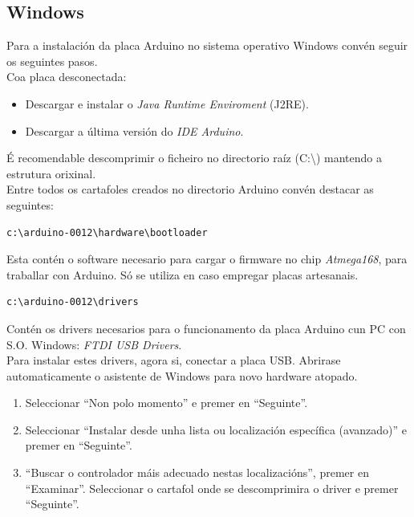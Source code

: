  \subsection{Windows}

 Para a instalación da placa Arduino no sistema operativo Windows convén seguir
 os seguintes pasos. \\

 Coa placa desconectada:

 \begin{itemize}
  \item Descargar e instalar o \textit{Java Runtime Enviroment} (J2RE).
  \item Descargar a última versión do \textit{IDE Arduino}.
 \end{itemize}

 É recomendable descomprimir o ficheiro no directorio raíz (C:\textbackslash)
 mantendo a estrutura orixinal. \\
 
 Entre todos os cartafoles creados no directorio Arduino convén destacar as
 seguintes: \\

 \begin{lstlisting}[language=bash,frame=single]
  c:\arduino-0012\hardware\bootloader
 \end{lstlisting}

 Esta contén o software necesario para cargar o firmware no chip
 \textit{Atmega168}, para traballar con Arduino. Só se utiliza en caso
 empregar placas artesanais. \\

 \begin{lstlisting}[language=bash,frame=single]
  c:\arduino-0012\drivers
 \end{lstlisting}

 Contén os drivers necesarios para o funcionamento da placa Arduino cun PC con
 S.O. Windows: \textit{FTDI USB Drivers}. \\

 Para instalar estes drivers, agora si, conectar  a placa USB. Abrirase
 automaticamente o asistente de Windows para novo hardware atopado.

 \begin{enumerate}
  \item Seleccionar ``Non polo momento'' e premer en ``Seguinte''.
  \item Seleccionar
        ``Instalar desde unha lista ou localización específica (avanzado)'' e
        premer en ``Seguinte''.
  \item ``Buscar o controlador máis adecuado nestas localizacións'', premer en
        ``Examinar''. Seleccionar o cartafol onde se descomprimira o driver e
          premer ``Seguinte''.
 \end{enumerate}

